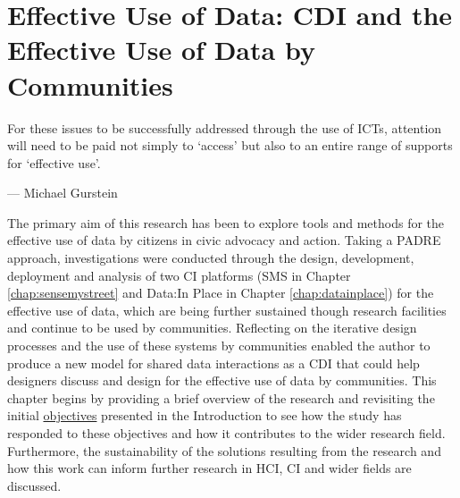 \chapter[Effective Use of Data]{Effective Use of Data: CDI and the Effective Use of Data by Communities}
\label{chap:discussion}

\ifpdf
    \graphicspath{{Chapter7/Figs/Raster/}{Chapter7/Figs/PDF/}{Chapter7/Figs/}}
\else
    \graphicspath{{Chapter7/Figs/Vector/}{Chapter7/Figs/}}
\fi

\epigraph{For these issues to be successfully addressed through the use of ICTs, attention will need to be paid not simply to `access' but also to an entire range of supports for `effective use'.}{--- \textup{Michael Gurstein}}

The primary aim of this research has been to explore tools and methods for the effective use of data by citizens in civic advocacy and action. Taking a PADRE approach, investigations were conducted through the design, development, deployment and analysis of two CI platforms (SMS in Chapter \ref{chap:sensemystreet} and Data:In Place in Chapter \ref{chap:datainplace}) for the effective use of data, which are being further sustained though research facilities and continue to be used by communities. Reflecting on the iterative design processes and the use of these systems by communities enabled the author to produce a new model for shared data interactions as a CDI that could help designers discuss and design for the effective use of data by communities. This chapter begins by providing a brief overview of the research and revisiting the initial \hyperlink{objectives}{objectives} presented in the Introduction to see how the study has responded to these objectives and how it contributes to the wider research field. Furthermore, the sustainability of the solutions resulting from the research and how this work can inform further research in HCI, CI and wider fields are discussed. 
\clearpage


